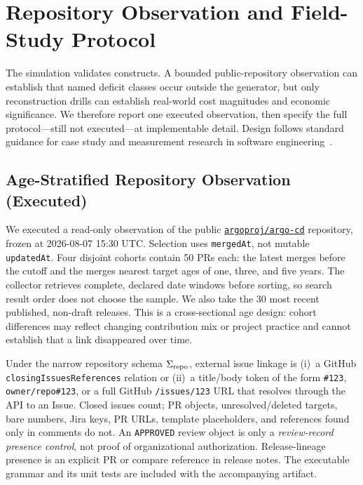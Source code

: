 \section{Repository Observation and Field-Study Protocol}
\label{sec:field}

The simulation validates constructs. A bounded public-repository observation can
establish that named deficit classes occur outside the generator, but only
reconstruction drills can establish real-world cost magnitudes and economic
significance. We therefore report one executed observation, then specify the full
protocol---still not executed---at implementable detail. Design follows standard
guidance for case study and measurement research in software
engineering~\cite{runeson2009,wohlin2012}.

\subsection{Age-Stratified Repository Observation (Executed)}
We executed a read-only observation of the public
\href{https://github.com/argoproj/argo-cd}{\texttt{argoproj/argo-cd}} repository,
frozen at 2026-08-07 15:30 UTC. Selection uses \texttt{mergedAt}, not mutable
\texttt{updatedAt}. Four disjoint cohorts contain 50 PRs each: the latest merges
before the cutoff and the merges nearest target ages of one, three, and five years.
The collector retrieves complete, declared date windows before sorting, so search
result order does not choose the sample. We also take the 30 most recent published,
non-draft releases. This is a cross-sectional age design: cohort differences may
reflect changing contribution mix or project practice and cannot establish that a
link disappeared over time.

Under the narrow repository schema $\Sigma_{\mathrm{repo}}$, external issue linkage
is (i)~a GitHub \texttt{closingIssuesReferences} relation or (ii)~a title/body token
of the form \texttt{\#123}, \texttt{owner/repo\#123}, or a full GitHub
\texttt{/issues/123} URL that resolves through the API to an Issue. Closed issues
count; PR objects, unresolved/deleted targets, bare numbers, Jira keys, PR URLs,
template placeholders, and references found only in comments do not. An
\texttt{APPROVED} review object is only a \emph{review-record presence control},
not proof of organizational authorization. Release-lineage presence is an explicit
PR or compare reference in release notes. The executable grammar and its unit tests
are included with the accompanying artifact.

